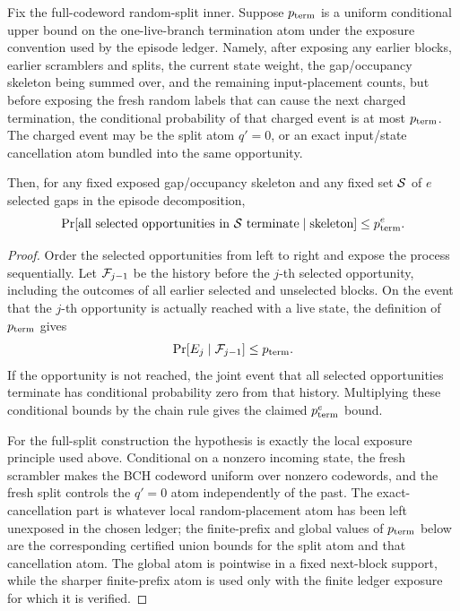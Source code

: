 \begin{lemma}
\label{lem:fullsplit-selected-gap-product}
Fix the full-codeword random-split inner.  Suppose \(p_{\rm term}\) is a uniform conditional upper bound on the
one-live-branch termination atom under the exposure convention used by the episode ledger.  Namely, after exposing any
earlier blocks, earlier scramblers and splits, the current state weight, the gap/occupancy skeleton being summed over,
and the remaining input-placement counts, but before exposing the fresh random labels that can cause the next charged
termination, the conditional probability of that charged event is at most \(p_{\rm term}\).  The charged event may be the
split atom \(q'=0\), or an exact input/state cancellation atom bundled into the same opportunity.

Then, for any fixed exposed gap/occupancy skeleton and any fixed set \({\cal S}\) of \(e\) selected gaps in the episode
decomposition,
\[
\Pr[\text{all selected opportunities in }{\cal S}\text{ terminate}\mid\text{skeleton}]
\le
p_{\rm term}^{e}.
\]
\end{lemma}

\begin{proof}
Order the selected opportunities from left to right and expose the process sequentially.  Let \({\cal F}_{j-1}\) be the
history before the \(j\)-th selected opportunity, including the outcomes of all earlier selected and unselected blocks.
On the event that the \(j\)-th opportunity is actually reached with a live state, the definition of \(p_{\rm term}\)
gives
\[
\Pr[E_j\mid {\cal F}_{j-1}]\le p_{\rm term}.
\]
If the opportunity is not reached, the joint event that all selected opportunities terminate has conditional probability
zero from that history.  Multiplying these conditional bounds by the chain rule gives the claimed \(p_{\rm term}^e\)
bound.

For the full-split construction the hypothesis is exactly the local exposure principle used above.  Conditional on a
nonzero incoming state, the fresh scrambler makes the BCH codeword uniform over nonzero codewords, and the fresh split
controls the \(q'=0\) atom independently of the past.  The exact-cancellation part is whatever local random-placement
atom has been left unexposed in the chosen ledger; the finite-prefix and global values of \(p_{\rm term}\) below are the
corresponding certified union bounds for the split atom and that cancellation atom.  The global atom is pointwise in a
fixed next-block support, while the sharper finite-prefix atom is used only with the finite ledger exposure for which it
is verified.
\end{proof}

